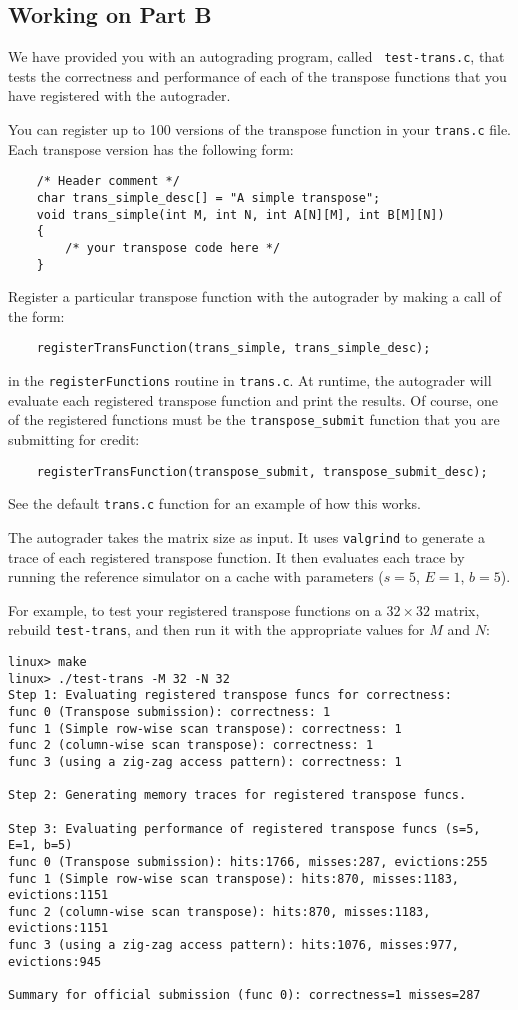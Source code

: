 \documentclass[11pt]{article}
\begin{document}
\subsection{Working on Part B}
We have provided you with an autograding program, called {\tt
  test-trans.c}, that tests the correctness and performance of each of
the transpose functions that you have registered with the autograder.

You can register up to 100 versions of the transpose function in your
{\tt  trans.c} file. Each transpose version has the following form:
\begin{verbatim}
    /* Header comment */
    char trans_simple_desc[] = "A simple transpose";
    void trans_simple(int M, int N, int A[N][M], int B[M][N])
    {
        /* your transpose code here */
    }
\end{verbatim}
Register a particular transpose function with the autograder by making
a call of the form:
\begin{verbatim}
    registerTransFunction(trans_simple, trans_simple_desc);
\end{verbatim}
in the {\tt registerFunctions} routine in {\tt trans.c}. At runtime,
the autograder will evaluate each registered transpose function and
print the results. Of course, one of the registered functions must be
the \verb:transpose_submit: function that you are submitting for
credit:
\begin{verbatim}
    registerTransFunction(transpose_submit, transpose_submit_desc);
\end{verbatim}
See the default {\tt trans.c} function for an example of how this works.

The autograder takes the matrix size as input. It uses {\tt valgrind}
to generate a trace of each registered transpose function.  It then
evaluates each trace by running the reference simulator on a cache
with parameters ($s=5$, $E=1$, $b=5$).

For example, to test your registered transpose functions on a $32
\times 32$ matrix, rebuild \verb:test-trans:, and then run it with the
appropriate values for $M$ and $N$:
{\small
\begin{verbatim}
linux> make
linux> ./test-trans -M 32 -N 32
Step 1: Evaluating registered transpose funcs for correctness:
func 0 (Transpose submission): correctness: 1
func 1 (Simple row-wise scan transpose): correctness: 1
func 2 (column-wise scan transpose): correctness: 1
func 3 (using a zig-zag access pattern): correctness: 1

Step 2: Generating memory traces for registered transpose funcs.

Step 3: Evaluating performance of registered transpose funcs (s=5, E=1, b=5)
func 0 (Transpose submission): hits:1766, misses:287, evictions:255
func 1 (Simple row-wise scan transpose): hits:870, misses:1183, evictions:1151
func 2 (column-wise scan transpose): hits:870, misses:1183, evictions:1151
func 3 (using a zig-zag access pattern): hits:1076, misses:977, evictions:945

Summary for official submission (func 0): correctness=1 misses=287
\end{verbatim}
}
\end{document}
